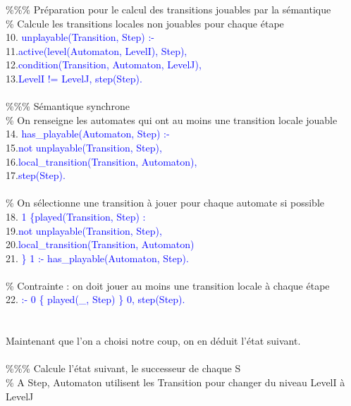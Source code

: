 \documentclass[12pt,a4paper]{article}
\begin{document}
{	\%\%\% Préparation pour le calcul des transitions jouables par la sémantique\\
	\% Calcule les transitions locales non jouables pour chaque étape\\
	10. \textcolor{blue}{unplayable(Transition, Step) :-}\\
	11.\qquad\qquad\textcolor{blue}{active(level(Automaton, LevelI), Step),}\\
	12.\qquad\qquad\textcolor{blue}{condition(Transition, Automaton, LevelJ),}\\
	13.\qquad\qquad\textcolor{blue}{LevelI != LevelJ, step(Step).}\\ \\
	\%\%\% Sémantique synchrone\\
	\% On renseigne les automates qui ont au moins une transition locale jouable\\
	14. \textcolor{blue}{has\_playable(Automaton, Step) :-}\\
	15.\qquad\qquad\textcolor{blue}{not unplayable(Transition, Step),}\\
	16.\qquad\qquad\textcolor{blue}{local\_transition(Transition, Automaton),}\\
	17.\qquad\qquad\textcolor{blue}{step(Step).}\\ \\
	\% On sélectionne une transition à jouer pour chaque automate si possible\\
	18. \textcolor{blue}{1 \{played(Transition, Step) :}\\
	19.\qquad\qquad\textcolor{blue}{not unplayable(Transition, Step),}\\
	20.\qquad\qquad\textcolor{blue}{local\_transition(Transition, Automaton)}\\
	21. \textcolor{blue}{\} 1 :- has\_playable(Automaton, Step).}\\ \\
	\% Contrainte : on doit jouer au moins une transition locale à chaque étape\\
	22. \textcolor{blue}{:- 0 \{ played(\_, Step) \} 0, step(Step).}\\ \\ \\
	Maintenant que l'on a choisi notre coup, on en déduit l'état suivant.\\ \\
	\%\%\% Calcule l'état suivant, le successeur de chaque S\\
	\% A Step, Automaton utilisent les Transition pour changer du niveau LevelI à LevelJ\\
}
\end{document}
